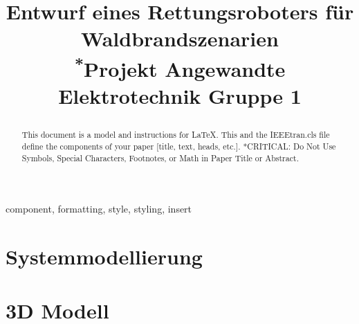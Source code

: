 \documentclass[conference]{IEEEtran}
\begin{document}
\title{Entwurf eines Rettungsroboters für Waldbrandszenarien\\
{\footnotesize \textsuperscript{*}Projekt Angewandte Elektrotechnik Gruppe 1}

}

\author{
\and
{}
\and
{}
\and
{}

}

\maketitle

\begin{abstract}
This document is a model and instructions for \LaTeX.
This and the IEEEtran.cls file define the components of your paper [title, text, heads, etc.]. *CRITICAL: Do Not Use Symbols, Special Characters, Footnotes, 
or Math in Paper Title or Abstract.
\end{abstract}

\begin{IEEEkeywords}
component, formatting, style, styling, insert
\end{IEEEkeywords}

 

\section{Systemmodellierung}


\section{3D Modell}

\end{document}
